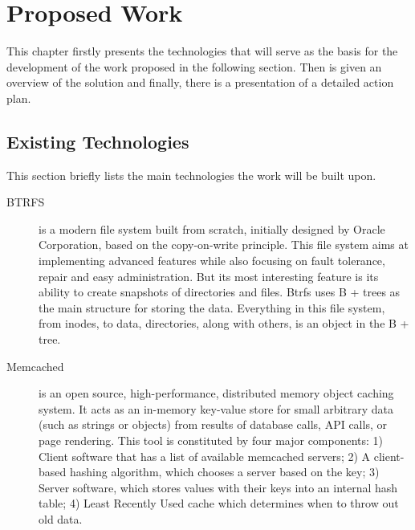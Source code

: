 
\chapter{Proposed Work}
\label{cha:proposed_work}

This chapter firstly presents the technologies that will serve as the basis for the development of the work proposed in the following section. Then is given an overview of the solution and finally, there is a presentation of a detailed action plan.

\section{Existing Technologies} %
\label{sec:existing_technologies}
This section briefly lists the main technologies the work will be built upon.

\begin{description}
	\item [BTRFS] is a modern file system built from scratch, initially designed by Oracle Corporation, based on the copy-on-write principle. This file system aims at implementing advanced features while also focusing on fault tolerance, repair and easy administration. But its most interesting feature is its ability to create snapshots of directories and files. Btrfs uses B + trees as the main structure for storing the data. Everything in this file system, from inodes, to data, directories, along with others, is an object in the B + tree.
	\item [Memcached~\cite{github_memcached}] is an open source, high-performance, distributed memory object caching system. It acts as an in-memory key-value store for small arbitrary data (such as strings or objects) from results of database calls, API calls, or page rendering. This tool is constituted by four major components: 1) Client software that has a list of available memcached servers;  2) A client-based hashing algorithm, which chooses a server based on the key;  3) Server software, which stores values with their keys into an internal hash table; 4) Least Recently Used cache which determines when to throw out old data.
\end{description}


